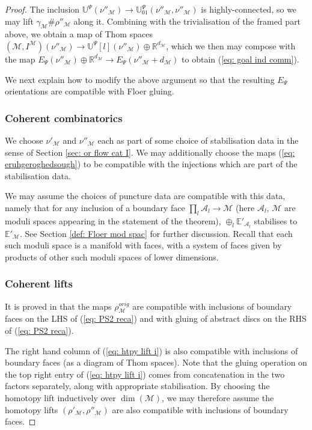 \documentclass{TPmod}
\def\bE{\mathbb{E}}
\def\bR{\mathbb{R}}
\def\bU{\mathbb{U}}
\newcommand{\cA}{\mathcal{A}}
\newcommand{\cM}{\mathcal{M}}
\numberwithin{equation}{section}
\begin{document}
\begin{proof}
        The inclusion $\bU^\Psi(\nu''_\cM) \to \bU^\Psi_{01}(\nu''_\cM, \nu''_\cM)$ is highly-connected, so we may lift $\gamma_\cM \# \rho''_\cM$ along it. Combining with the trivialisation of the framed part above, we obtain a map of Thom spaces $(\cM, I^\cM)(\nu''_\cM) \to \bU^\Psi[l](\nu''_\cM) \oplus \bR^{d_\cM}$, which we then may compose with the map $E_\Psi(\nu''_\cM)\oplus \bR^{d_\cM} \to E_\Psi(\nu''_\cM + d_\cM)$ to obtain (\ref{eq: goal ind comm}).

        We next explain how to modify the above argument so that the resulting $E_\Psi$ orientations are compatible with Floer gluing. 
    \subsubsection*{Coherent combinatorics}
    
        We choose $\nu'_\cM$ and $\nu''_\cM$ each as part of some choice of stabilisation data in the sense of Section \ref{sec: or flow cat I}. We may additionally choose the maps (\ref{eq: eruhgeroghedsough}) to be compatible with the injections which are part of the stabilisation data. 
        
        We may assume the choices of puncture data are compatible with this data, namely that for any inclusion of a boundary face $\prod_l \cA_l \to \cM$ (here $\cA_l$, $\cM$ are moduli spaces appearing in the statement of the theorem), $\oplus_l \bE'_{\cA_l}$ stabilises to $\bE'_\cM$. See Section \ref{def: Floer mod spac} for further discussion. Recall that each such moduli space is a manifold with faces, with a system of faces given by products of other such moduli spaces of lower dimensions.

    
    \subsubsection*{Coherent lifts}
        It is proved in \cite[Section 6]{PS2} that the maps $\rho^{orig}_\cM$ are compatible with inclusions of boundary faces on the LHS of (\ref{eq: PS2 reca}) and with gluing of abstract discs on the RHS of (\ref{eq: PS2 reca}).

        The right hand column of (\ref{eq: htpy lift i}) is also compatible with inclusions of boundary faces (as a diagram of Thom spaces). Note that the gluing operation on the top right entry of (\ref{eq: htpy lift i}) comes from concatenation in the two factors separately, along with appropriate stabilisation. By choosing the homotopy lift inductively over $\dim(\cM)$, we may therefore assume the homotopy lifts $(\rho'_\cM, \rho''_\cM)$ are also compatible with inclusions of boundary faces.


\end{proof}
\end{document}
